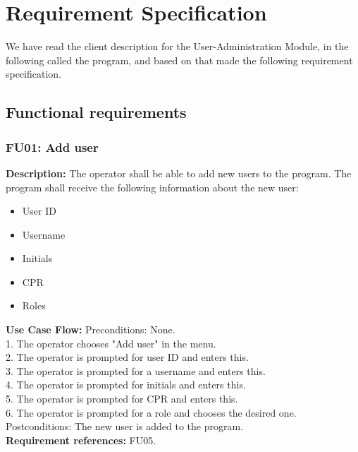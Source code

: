 \section{Requirement Specification}
We have read the client description for the User-Administration Module, in the following called the program, and based on that made the following requirement specification.

\subsection{Functional requirements}
\begin{adjustwidth}{2em}{0pt}
    
    \subsubsection*{FU01: Add user}
    \begin{adjustwidth}{1em}{0pt}
        \textbf{Description:}
        The operator shall be able to add new users to the program. The program shall receive the following information about the new user:
        \begin{multicols}{2}
            \begin{itemize}
                \item User ID
                \item Username
                \item Initials
                \item CPR
                \item Roles
            \end{itemize}
        \end{multicols}
        \noindent\textbf{Use Case Flow:}
        Preconditions: None.\\
        1. The operator chooses "Add user" in the menu.\\
        2. The operator is prompted for user ID and enters this.\\
        3. The operator is prompted for a username and enters this.\\
        4. The operator is prompted for initials and enters this.\\
        5. The operator is prompted for CPR and enters this.\\
        6. The operator is prompted for a role and chooses the desired one.\\
        Postconditions: The new user is added to the program.\\
        \textbf{Requirement references:}
        FU05.
    \end{adjustwidth}
    

\end{adjustwidth}
